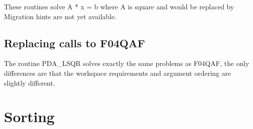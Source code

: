 \documentclass[11pt,twoside,nolof]{starlink}
\begin{document}
   These routines solve A * x = b where A is square and would be replaced
   by
   Migration hints are not yet available.


\subsection{Replacing calls to F04QAF}
   The routine PDA\_LSQR solves exactly the same problems as F04QAF, the
   only differences are that the workspace requirements and argument
   ordering are slightly different.


\section{Sorting}
\end{document}

